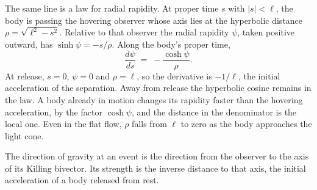 \documentclass[a4paper]{article}
\begin{document}
The same line is a law for radial rapidity. At proper time \(s\) with \(|s|<\ell\), the body is passing the hovering observer whose axis lies at the hyperbolic distance \(\rho=\sqrt{\ell^{2}-s^{2}}\). Relative to that observer the radial rapidity \(\psi\), taken positive outward, has \(\sinh\psi=-s/\rho\). Along the body's proper time,
\begin{equation}
\frac{d\psi}{ds} \;=\; -\frac{\cosh\psi}{\rho}.
\label{eq:flat-rapidity}
\end{equation}
At release, \(s=0\), \(\psi=0\) and \(\rho=\ell\), so the derivative is \(-1/\ell\), the initial acceleration of the separation. Away from release the hyperbolic cosine remains in the law. A body already in motion changes its rapidity faster than the hovering acceleration, by the factor \(\cosh\psi\), and the distance in the denominator is the local one. Even in the flat flow, \(\rho\) falls from \(\ell\) to zero as the body approaches the light cone.

The direction of gravity at an event is the direction from the observer to the axis of its Killing bivector. Its strength is the inverse distance to that axis, the initial acceleration of a body released from rest.
\end{document}
